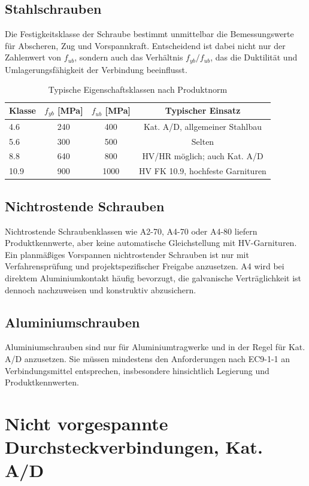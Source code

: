 \documentclass[10pt,a4paper]{article}
\begin{document}
\subsection{Stahlschrauben}
Die Festigkeitsklasse der Schraube bestimmt unmittelbar die Bemessungswerte für Abscheren, Zug und Vorspannkraft. Entscheidend ist dabei nicht nur der Zahlenwert von $f_{ub}$, sondern auch das Verhältnis $f_{yb}/f_{ub}$, das die Duktilität und Umlagerungsfähigkeit der Verbindung beeinflusst.

\begin{table}[H]
\centering
\caption{Typische Eigenschaftsklassen nach Produktnorm}
\begin{tabular}{@{}lccc@{}}
\toprule
\textbf{Klasse} & $f_{yb}$ [MPa] & $f_{ub}$ [MPa] & \textbf{Typischer Einsatz} \\
\midrule
4.6 & 240 & 400 & Kat. A/D, allgemeiner Stahlbau \\
5.6 & 300 & 500 & Selten \\
8.8 & 640 & 800 & HV/HR möglich; auch Kat. A/D \\
10.9 & 900 & 1000 & HV FK 10.9, hochfeste Garnituren \\
\bottomrule
\end{tabular}
\end{table}

\subsection{Nichtrostende Schrauben}
Nichtrostende Schraubenklassen wie A2-70, A4-70 oder A4-80 liefern Produktkennwerte, aber keine automatische Gleichstellung mit HV-Garnituren. Ein planmäßiges Vorspannen nichtrostender Schrauben ist nur mit Verfahrensprüfung und projektspezifischer Freigabe anzusetzen. A4 wird bei direktem Aluminiumkontakt häufig bevorzugt, die galvanische Verträglichkeit ist dennoch nachzuweisen und konstruktiv abzusichern.

\subsection{Aluminiumschrauben}
Aluminiumschrauben sind nur für Aluminiumtragwerke und in der Regel für Kat. A/D anzusetzen. Sie müssen mindestens den Anforderungen nach EC9-1-1 an Verbindungsmittel entsprechen, insbesondere hinsichtlich Legierung und Produktkennwerten.

\section{Nicht vorgespannte Durchsteckverbindungen, Kat. A/D}
\end{document}
